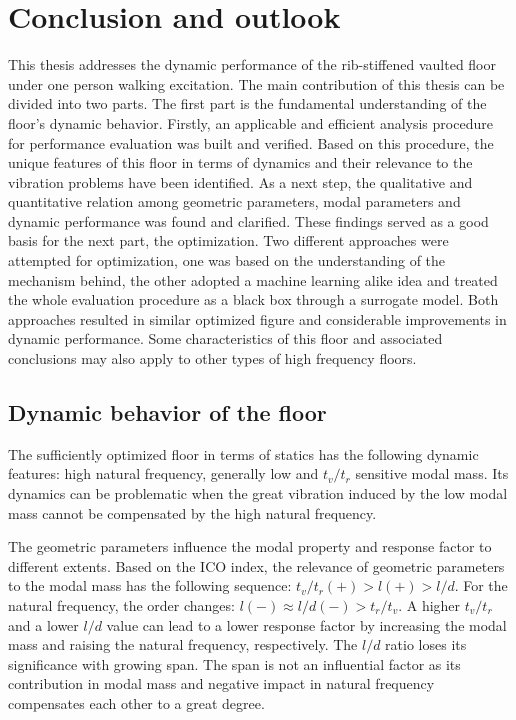 \chapter{Conclusion and outlook}
\label{chap6}

This thesis addresses the dynamic performance of the rib-stiffened vaulted floor under one person walking excitation. The main contribution of this thesis can be divided into two parts. The first part is the fundamental understanding of the floor's dynamic behavior. Firstly, an applicable and efficient analysis procedure for performance evaluation was built and verified. Based on this procedure, the unique features of this floor in terms of dynamics and their relevance to the vibration problems have been identified. As a next step, the qualitative and quantitative relation among geometric parameters, modal parameters and dynamic performance was found and clarified. These findings served as a good basis for the next part, the optimization. Two different approaches were attempted for optimization, one was based on the understanding of the mechanism behind, the other adopted a machine learning alike idea and treated the whole evaluation procedure as a black box through a surrogate model. Both approaches resulted in similar optimized figure and considerable improvements in dynamic performance. Some characteristics of this floor and associated conclusions may also apply to other types of high frequency floors. 

\section{Dynamic behavior of the floor}
The sufficiently optimized floor in terms of statics has the following dynamic features: high natural frequency, generally low and $t_v/t_r$ sensitive modal mass. Its dynamics can be problematic when the great vibration induced by the low modal mass cannot be compensated by the high natural frequency. 

The geometric parameters influence the modal property and response factor to different extents. Based on the ICO index, the relevance of geometric parameters to the modal mass has the following sequence: $t_v/t_r(+)>l(+)>l/d$. For the natural frequency, the order changes: $l(-)\approx l/d(-)>t_r/t_v$. A higher $t_v/t_r$ and a lower $l/d$ value can lead to a lower response factor by increasing the modal mass and raising the natural frequency, respectively. The $l/d$ ratio loses its significance with growing span. The span is not an influential factor as its contribution in modal mass and negative impact in natural frequency compensates each other to a great degree.

